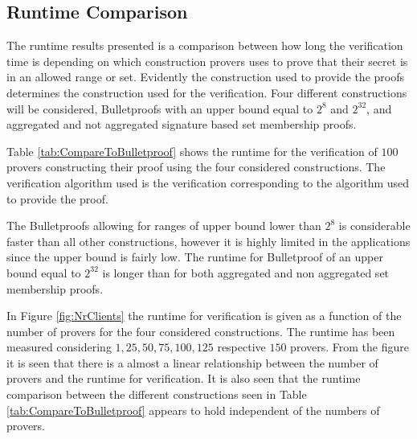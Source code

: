 

\subsection*{Runtime Comparison}
The runtime results presented is a comparison between how long the verification time is depending on which construction provers uses to prove that their secret is in an allowed range or set.  Evidently the construction used to provide the proofs determines the construction used for the verification. Four different constructions will be considered, Bulletproofs with an upper bound equal to $2^8$ and $2^{32}$, and aggregated and not aggregated signature based set membership proofs. 

Table \ref{tab:CompareToBulletproof} shows the runtime for the verification of $100$ provers constructing their proof using the four considered constructions. The verification algorithm used is the verification corresponding to the algorithm used to provide the proof. 

The Bulletproofs allowing for ranges of upper bound lower than $2^8$ is considerable faster than all other constructions, however it is highly limited in the applications since the upper bound is fairly low. The runtime for Bulletproof of an upper bound equal to $2^{32}$ is longer than for both aggregated and non aggregated set membership proofs. 

In Figure \ref{fig:NrClients} the runtime for verification is given as a function of the number of provers for the  four considered constructions. The runtime has been measured considering  $1,25,50,75,100,125$ respective $150$ provers.  From the figure it is seen that there is a almost a linear relationship between the number of provers and the runtime for verification. It is also seen that the runtime comparison between the different constructions seen in Table \ref{tab:CompareToBulletproof}  appears to hold independent of the numbers of provers. 

